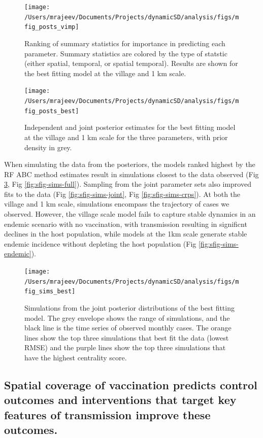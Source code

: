\documentclass[
]{book}
\begin{document}
\begin{figure}
\texttt{[image: /Users/mrajeev/Documents/Projects/dynamicSD/analysis/figs/mfig\_posts\_vimp]} \caption{Ranking of summary statistics for importance in predicting each parameter. Summary statistics are colored by the type of statstic (either spatial, temporal, or spatial temporal). Results are shown for the best fitting model at the village and 1 km scale.}\label{fig:mfig-posts-vimp}
\end{figure}



\begin{figure}
\texttt{[image: /Users/mrajeev/Documents/Projects/dynamicSD/analysis/figs/mfig\_posts\_best]} \caption{Independent and joint posterior estimates for the best fitting model at the village and 1 km scale for the three parameters, with prior density in grey.}\label{fig:mfig-posts-best}
\end{figure}



When simulating the data from the posteriors, the models ranked highest by the RF ABC method estimates result in simulations closest to the data observed (Fig \ref{fig:mfig-sims-best}, Fig \ref{fig:sfig-sims-full}). Sampling from the joint parameter sets also improved fits to the data (Fig \ref{fig:sfig-sims-joint}, Fig \ref{fig:sfig-sims-crps}). At both the village and 1 km scale, simulations encompass the trajectory of cases we observed. However, the village scale model fails to capture stable dynamics in an endemic scenario with no vaccination, with transmission resulting in significnt declines in the host population, while models at the 1km scale generate stable endemic incidence without depleting the host population (Fig \ref{fig:sfig-sims-endemic}).

\begin{figure}
\texttt{[image: /Users/mrajeev/Documents/Projects/dynamicSD/analysis/figs/mfig\_sims\_best]} \caption{Simulations from the joint posterior distributions of the best fitting model. The grey envelope shows the range of simulations, and the black line is the time series of observed monthly cases. The orange lines show the top three simulations that best fit the data (lowest RMSE) and the purple lines show the top three simulations that have the highest centrality score.}\label{fig:mfig-sims-best}
\end{figure}



\hypertarget{spatial-coverage-of-vaccination-predicts-control-outcomes-and-interventions-that-target-key-features-of-transmission-improve-these-outcomes.}{%
\subsection{Spatial coverage of vaccination predicts control outcomes and interventions that target key features of transmission improve these outcomes.}\label{spatial-coverage-of-vaccination-predicts-control-outcomes-and-interventions-that-target-key-features-of-transmission-improve-these-outcomes.}}
\end{document}
